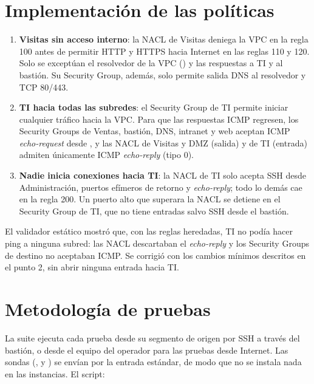 \section{Implementación de las políticas}

\begin{enumerate}
  \item \textbf{Visitas sin acceso interno}: la NACL de Visitas deniega la VPC en la regla 100
    antes de permitir HTTP y HTTPS hacia Internet en las reglas 110 y 120. Solo se exceptúan el
    resolvedor de la VPC () y las respuestas a TI y al bastión. Su Security
    Group, además, solo permite salida DNS al resolvedor y TCP 80/443.
  \item \textbf{TI hacia todas las subredes}: el Security Group de TI permite iniciar cualquier
    tráfico hacia la VPC. Para que las respuestas ICMP regresen, los Security Groups de Ventas,
    bastión, DNS, intranet y web aceptan ICMP \emph{echo-request} desde , y
    las NACL de Visitas y DMZ (salida) y de TI (entrada) admiten únicamente ICMP
    \emph{echo-reply} (tipo 0).
  \item \textbf{Nadie inicia conexiones hacia TI}: la NACL de TI solo acepta SSH desde
    Administración, puertos efímeros de retorno y \emph{echo-reply}; todo lo demás cae en la
    regla 200. Un puerto alto que superara la NACL se detiene en el Security Group de TI, que
    no tiene entradas salvo SSH desde el bastión.
\end{enumerate}

\begin{infobox}
El validador estático mostró que, con las reglas heredadas, TI no podía hacer ping a ninguna
subred: las NACL descartaban el \emph{echo-reply} y los Security Groups de destino no aceptaban
ICMP. Se corrigió con los cambios mínimos descritos en el punto 2, sin abrir ninguna entrada
hacia TI.
\end{infobox}

\section{Metodología de pruebas}

La suite  ejecuta cada prueba desde su segmento de origen por SSH
a través del bastión, o desde el equipo del operador para las pruebas desde Internet. Las sondas
(,  y ) se envían por
la entrada estándar, de modo que no se instala nada en las instancias. El script:

